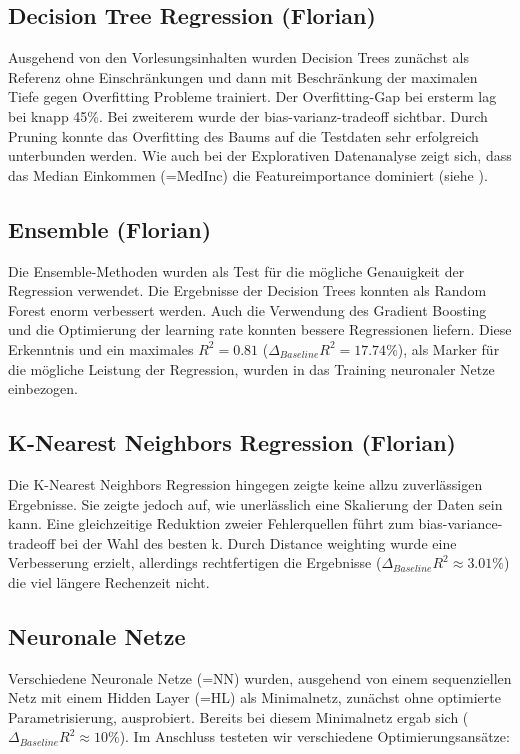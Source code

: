 \documentclass[9pt,a4paper,twocolumn,twoside]{tau-class/tau}
\begin{document}
        
\subsection{Decision Tree Regression (Florian)}
        Ausgehend von den Vorlesungsinhalten wurden Decision Trees zunächst als Referenz ohne Einschränkungen
        und dann mit Beschränkung der maximalen Tiefe gegen Overfitting Probleme trainiert. 
        Der Overfitting-Gap bei ersterm lag bei knapp 45\%. Bei zweiterem wurde der bias-varianz-tradeoff sichtbar.
        Durch Pruning konnte das Overfitting des Baums auf die Testdaten sehr erfolgreich unterbunden werden. 
        Wie auch bei der Explorativen Datenanalyse zeigt sich, dass das Median Einkommen (=MedInc) die Featureimportance dominiert 
        (siehe ). 

\subsection{Ensemble (Florian)}
        Die Ensemble-Methoden wurden als Test für die mögliche Genauigkeit der Regression verwendet.
        Die Ergebnisse der Decision Trees konnten als Random Forest enorm verbessert werden. 
        Auch die Verwendung des Gradient Boosting und die Optimierung der learning rate konnten bessere Regressionen liefern. 
        Diese Erkenntnis und ein maximales $R^2 = 0.81$ ($\Delta_{Baseline} R^2 = 17.74\%$), als Marker für die mögliche Leistung der Regression,
        wurden in das Training neuronaler Netze einbezogen.


\subsection{K-Nearest Neighbors Regression (Florian)}
        Die K-Nearest Neighbors Regression hingegen zeigte keine allzu zuverlässigen Ergebnisse. Sie zeigte jedoch auf,
        wie unerlässlich eine Skalierung der Daten sein kann. Eine gleichzeitige Reduktion zweier Fehlerquellen führt zum bias-variance-tradeoff bei der Wahl
        des besten k. Durch Distance weighting wurde eine Verbesserung erzielt, allerdings rechtfertigen die Ergebnisse ($\Delta_{Baseline} R^2 \approx 3.01\%$)
        die viel längere Rechenzeit nicht.


\subsection{Neuronale Netze}
        Verschiedene Neuronale Netze (=NN) wurden, ausgehend von einem sequenziellen Netz mit einem Hidden Layer (=HL) als Minimalnetz,
        zunächst ohne optimierte Parametrisierung, ausprobiert. Bereits bei diesem Minimalnetz ergab sich ($\Delta_{Baseline} R^2 \approx 10\%$).
        Im Anschluss testeten wir verschiedene Optimierungsansätze: 
\end{document}
